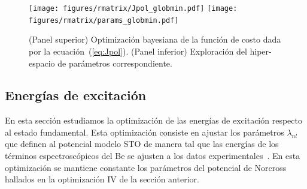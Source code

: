 \begin{figure}
\centering
\texttt{[image: figures/rmatrix/Jpol\_globmin.pdf]}
\texttt{[image: figures/rmatrix/params\_globmin.pdf]}
\caption[Minimización de la función de costo y exploración de parámetros.]
{(Panel superior) Optimización bayesiana de la función de costo dada por 
la ecuación~(\ref{eq:Jpol}). (Panel inferior) Exploración del 
hiper-espacio de parámetros correspondiente.}
\label{fig:globmin}
\end{figure}

\subsection{Energías de excitación}

En esta sección estudiamos la optimización de las energías de excitación 
respecto al estado fundamental. Esta optimización consiste en ajustar los 
parámetros $\lambda_{nl}$ que definen al potencial modelo STO de manera
tal que las energías de los términos espectroscópicos del Be se ajusten 
a los datos experimentales~\cite{NIST}. En esta optimización se mantiene 
constante los parámetros del potencial de Norcross hallados en la 
optimización IV de la sección anterior.

